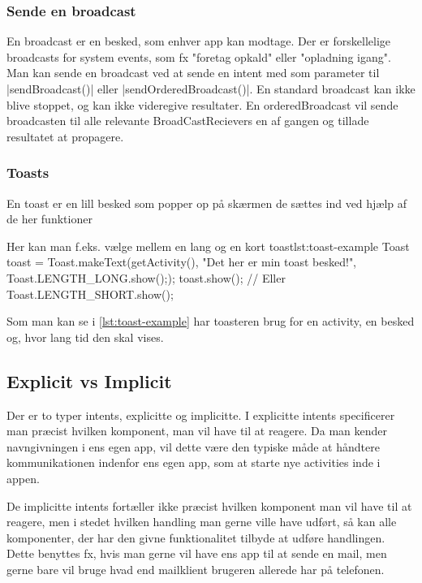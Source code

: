 \subsubsection{Sende en broadcast}

En broadcast er en besked, som enhver app kan modtage. Der er forskellelige broadcasts for system events, som fx "foretag opkald" eller "opladning igang". Man kan sende en broadcast ved at sende en intent med som parameter til \JavaInline|sendBroadcast()| eller \JavaInline|sendOrderedBroadcast()|.
En standard broadcast kan ikke blive stoppet, og kan ikke videregive resultater. En orderedBroadcast vil sende broadcasten til alle relevante BroadCastRecievers en af gangen og tillade resultatet at propagere.

\subsubsection{Toasts}

En toast er en lill besked som popper op på skærmen de sættes ind ved hjælp af de her funktioner  

\begin{JavaCode}{Her kan man f.eks. vælge mellem en lang og en kort toast}{lst:toast-example}
	Toast toast = Toast.makeText(getActivity(), "Det her er min toast besked!", Toast.LENGTH_LONG.show(););
	toast.show();
	// Eller Toast.LENGTH_SHORT.show();
\end{JavaCode}

Som man kan se i \autoref{lst:toast-example} har toasteren brug for en activity, en besked og, hvor lang tid den skal vises.

\subsection{Explicit vs Implicit}

Der er to typer intents, explicitte og implicitte. I explicitte intents specificerer man præcist hvilken komponent, man vil have til at reagere. Da man kender navngivningen i ens egen app, vil dette være den typiske måde at håndtere kommunikationen indenfor ens egen app, som at starte nye activities inde i appen.

De implicitte intents fortæller ikke præcist hvilken komponent man vil have til at reagere, men i stedet hvilken handling man gerne ville have udført, så kan alle komponenter, der har den givne funktionalitet tilbyde at udføre handlingen. Dette benyttes fx, hvis man gerne vil have ens app til at sende en mail, men gerne bare vil bruge hvad end mailklient brugeren allerede har på telefonen.

